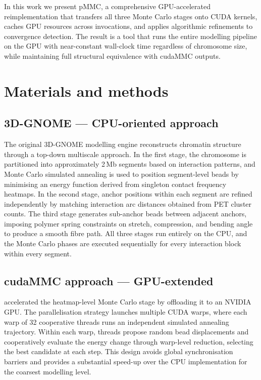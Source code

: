 \documentclass[webpdf,traditional,large]{oup-authoring-template}%
\begin{document}
In this work we present pMMC, a comprehensive GPU-accelerated reimplementation that transfers all three Monte Carlo stages onto CUDA kernels, caches GPU resources across invocations, and applies algorithmic refinements to convergence detection. The result is a tool that runs the entire modelling pipeline on the GPU with near-constant wall-clock time regardless of chromosome size, while maintaining full structural equivalence with cudaMMC outputs.


\section{Materials and methods}

\subsection{3D-GNOME --- CPU-oriented approach}

The original 3D-GNOME modelling engine \citep{Szalaj2016engine} reconstructs chromatin structure through a top-down multiscale approach. In the first stage, the chromosome is partitioned into approximately 2\,Mb segments based on interaction patterns, and Monte Carlo simulated annealing is used to position segment-level beads by minimising an energy function derived from singleton contact frequency heatmaps. In the second stage, anchor positions within each segment are refined independently by matching interaction arc distances obtained from PET cluster counts. The third stage generates sub-anchor beads between adjacent anchors, imposing polymer spring constraints on stretch, compression, and bending angle to produce a smooth fibre path. All three stages run entirely on the CPU, and the Monte Carlo phases are executed sequentially for every interaction block within every segment.

\subsection{cudaMMC approach --- GPU-extended}

\citet{Wlasnowolski2023cudammc} accelerated the heatmap-level Monte Carlo stage by offloading it to an NVIDIA GPU. The parallelisation strategy launches multiple CUDA warps, where each warp of 32 cooperative threads runs an independent simulated annealing trajectory. Within each warp, threads propose random bead displacements and cooperatively evaluate the energy change through warp-level reduction, selecting the best candidate at each step. This design avoids global synchronisation barriers and provides a substantial speed-up over the CPU implementation for the coarsest modelling level.
\end{document}

